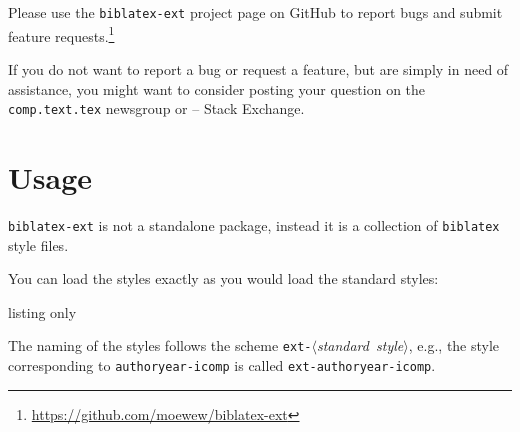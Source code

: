 \documentclass{ltxdockit}
\def\sty{\texttt}
\newcommand*{\gitbaseurl}{https://github.com/moewew/biblatex-ext}
\begin{document}
Please use the \sty{biblatex-ext} project page on GitHub to report bugs and
submit feature requests.\footnote{\url{\gitbaseurl}}

If you do not want to report a bug or request a feature, but are simply in need
of assistance, you might want to consider posting your question on the
\texttt{comp.text.tex} newsgroup or \tex{} -- \latex Stack Exchange.%

\section{Usage}

\sty{biblatex-ext} is not a standalone package, instead it is a collection of
\sty{biblatex} style files.

You can load the styles exactly as you would load the standard styles:
\begin{tcblisting}{listing only}
\usepackage[style=(*@$\langle$\normalfont\emph{style}$\rangle$@*)]{biblatex}
\end{tcblisting}

The naming of the styles follows the scheme
\mbox{\texttt{ext-}$\langle$\emph{standard style}$\rangle$}, e.g.,
the style corresponding to \texttt{authoryear-icomp} is called
\texttt{ext-authoryear-icomp}.
\end{document}

